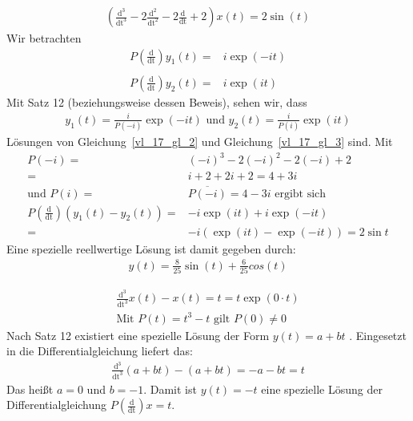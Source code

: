 \begin{Beispiel}{
	\begin{align*}
		\left(\frac{\mathrm{d^3}}{\mathrm{dt^3}} - 2 \frac{\mathrm{d^2}}
			{\mathrm{dt^2}} - 2 \frac{\mathrm{d}}{\mathrm{dt}} + 2\right) 
			x(t) = 2 \sin(t)
	\end{align*}
	Wir betrachten 
	\begin{align}
		P \left( \frac{\mathrm{d}}{\mathrm{dt}}\right)y_1(t) =& i\exp(-it) \\
			\label{vl_17_gl_2} \\
		P \left( \frac{\mathrm{d}}{\mathrm{dt}} \right) y_2(t) = & i \exp(it)
			\label{vl_17_gl_3}
	\end{align}
	Mit Satz 12 (beziehungsweise dessen Beweis),  sehen wir, dass 
	\begin{align*}
		y_1(t) = \frac{i}{P(-i)} \exp(-it) \text{ und }y_2(t) = \frac{i}{P(i)}
			\exp(it)
	\end{align*}
	Lösungen von Gleichung~\ref{vl_17_gl_2} und Gleichung~\ref{vl_17_gl_3} sind.
	Mit 
	\begin{align*}
		P(-i) = & (-i)^3 -2(-i)^2-2(-i)+2 \\ = & i + 2 + 2i + 2 = 4 +3i \\
		\text{und } P(i) = & \overline{P(-i)} = 4 -3i \text{ ergibt sich} \\
		P\left(\frac{\mathrm{d}}{\mathrm{dt}}\right)\left( y_1(t) - y_2(t)\right)
		= & -i \exp(it) + i \exp(-it)  \\
		= & -i (\exp(it) - \exp (-it)) = 2 \sin t
	\end{align*}
	Eine spezielle reellwertige Lösung ist damit gegeben durch:
	\begin{align*}
		y(t) = \frac{8}{25} \sin(t) + \frac{6}{25 }cos(t)
	\end{align*}
}\end{Beispiel}

\begin{Beispiel}{
	\begin{align*}
		\frac{\mathrm{d^3}}{\mathrm{dt^3}} x(t) - x(t) = t = t \exp(0 \cdot t) \\
		\text{Mit } P(t) = t^3 -t \text{ gilt } P(0) \neq 0
	\end{align*}
	Nach Satz 12  existiert eine spezielle Lösung der Form $y(t) = a + bt$ 
	. Eingesetzt in die Differentialgleichung liefert das: 
	\begin{align*}
		\frac{\mathrm{d^3}}{\mathrm{dt^3}}(a+bt) - (a +bt) = - a -bt = t
	\end{align*}
	Das heißt $a = 0$ und $b = -1$. Damit ist $y(t) = -t$ eine spezielle Lösung 
	der Differentialgleichung $P \left( \frac{\mathrm{d}}{\mathrm{dt}}\right) 
	x = t$.
}\end{Beispiel}
\cleardoublepage
